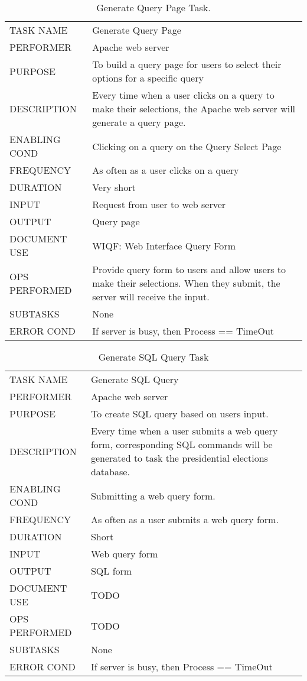 \documentclass{article}
\begin{document}
\begin{table}[h!]
  \centering
  \caption{Generate Query Page Task.}
  \label{tab:table5}
  \begin{tabular}{lp{10cm}}
       \hline
     TASK NAME & Generate Query Page\\
     PERFORMER & Apache web server\\
     PURPOSE & To build a query page for users to select their options for a specific query\\
     DESCRIPTION & Every time when a user clicks on a query to make their selections, the Apache web server will generate a query page.\\
     ENABLING COND & Clicking on a query on the Query Select Page\\
     FREQUENCY & As often as a user clicks on a query\\
     DURATION & Very short\\
     INPUT & Request from user to web server\\
     OUTPUT & Query page\\
     DOCUMENT USE & WIQF: Web Interface Query Form\\
     OPS PERFORMED & Provide query form to users and  allow users to make their selections. When they submit, the server will receive the input.\\
     SUBTASKS & None\\
     ERROR COND &  If server is busy, then Process == TimeOut\\
       \hline
  \end{tabular}
\end{table}

\begin{table}[h!]
  \centering
  \caption{Generate SQL Query Task}
  \label{tab:table6}
  \begin{tabular}{lp{10cm}}
       \hline
     TASK NAME & Generate SQL Query\\
     PERFORMER & Apache web server\\
     PURPOSE & To create SQL query based on users input.\\
     DESCRIPTION & Every time when a user submits a web query form, corresponding SQL commands will be generated to task the presidential elections database.\\
     ENABLING COND & Submitting a web query form.\\
     FREQUENCY & As often as a user submits a web query form.\\
     DURATION & Short\\
     INPUT & Web query form\\
     OUTPUT & SQL form\\
     DOCUMENT USE & {\color{red}TODO}\\
     OPS PERFORMED &  {\color{red}TODO}\\
     SUBTASKS & None\\
     ERROR COND &  If server is busy, then Process == TimeOut\\
       \hline
  \end{tabular}
\end{table}
\end{document}
